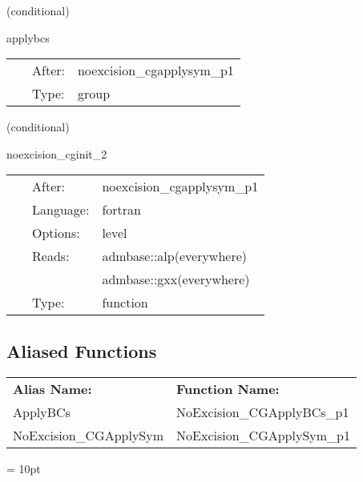 \vspace{5mm}

   (conditional) 

\hspace{5mm} applybcs 

\hspace{5mm}{\it apply boundary conditions (symmetries) 1 } 


\hspace{5mm}

 \begin{tabular*}{160mm}{cll} 
~ & After:  & noexcision\_cgapplysym\_p1 \\ 
~ & Type:  & group \\ 
\end{tabular*} 


\vspace{5mm}

   (conditional) 

\hspace{5mm} noexcision\_cginit\_2 

\hspace{5mm}{\it initialise the conjugate gradient method 2 } 


\hspace{5mm}

 \begin{tabular*}{160mm}{cll} 
~ & After:  & noexcision\_cgapplysym\_p1 \\ 
~ & Language:  & fortran \\ 
~ & Options:  & level \\ 
~ & Reads:  & admbase::alp(everywhere) \\ 
~& ~ &admbase::gxx(everywhere)\\ 
~ & Type:  & function \\ 
\end{tabular*} 


\subsection*{Aliased Functions}

\hspace{5mm}

 \begin{tabular*}{160mm}{ll} 

{\bf Alias Name:} ~~~~~~~ & {\bf Function Name:} \\ 
ApplyBCs & NoExcision\_CGApplyBCs\_p1 \\ 
NoExcision\_CGApplySym & NoExcision\_CGApplySym\_p1 \\ 
\end{tabular*} 



\vspace{5mm}\parskip = 10pt 


